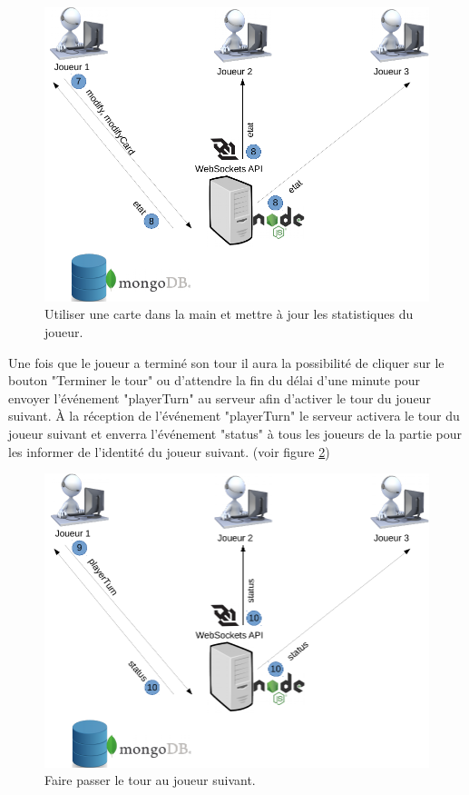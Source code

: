 \documentclass[12pt]{report}
\begin{document}
			\begin{figure}[h!]
		  	\centering
		    \includegraphics[scale=0.5]{images/useCase23.png}
		    \caption{Utiliser une carte dans la main et mettre à jour les statistiques du joueur.}
				\label{fig:useCase23}
		  \end{figure}

			Une fois que le joueur a terminé son tour il aura la possibilité de cliquer sur le bouton "Terminer le tour" ou d'attendre la fin du délai d'une minute pour envoyer l'événement "playerTurn" au serveur afin d'activer le tour du joueur suivant. À la réception de l'événement "playerTurn" le serveur activera le tour du joueur suivant et enverra l'événement "status" à tous les joueurs de la partie pour les informer de l'identité du joueur suivant. (voir figure \ref{fig:useCase24})

			\begin{figure}[h!]
		  	\centering
		    \includegraphics[scale=0.5]{images/useCase24.png}
		    \caption{Faire passer le tour au joueur suivant.}
				\label{fig:useCase24}
		  \end{figure}
\end{document}
